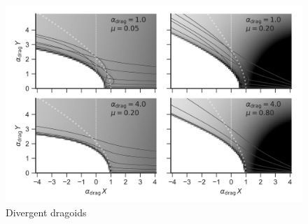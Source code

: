 \begin{figure}
  \includegraphics[width=\linewidth]{figs/dust-couple-div-stream}
  \caption{Divergent dragoids}
  \label{fig:divergent-dragoids}
\end{figure}

